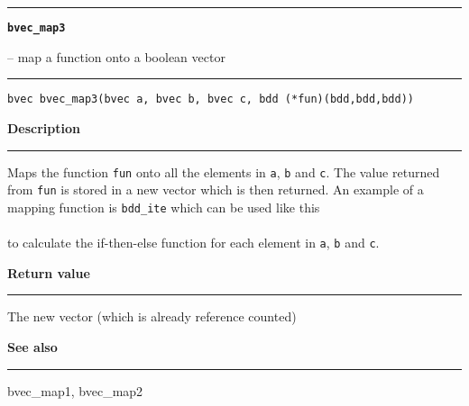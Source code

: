 \begin{minipage}{\textwidth}

\noindent\begin{minipage}{\textwidth}
\rule{\textwidth}{0.5mm}
{\tt\bf bvec\_map3 }
\--- map a function onto a boolean vector  \hspace{\fill}
\\\rule[1.5ex]{\textwidth}{0.5mm}
\end{minipage}

\noindent\begin{verbatim}
bvec bvec_map3(bvec a, bvec b, bvec c, bdd (*fun)(bdd,bdd,bdd)) 
\end{verbatim}

\vspace{\parsep}\noindent
{\bf Description}\\\rule[1.5ex]{\textwidth}{0.2mm}\vspace{-1.5ex}\setlength{\parindent}{1em}
Maps the function {\tt fun} onto all the elements in {\tt a},
           {\tt b} and {\tt c}. The value returned from {\tt fun} is stored
	   in a new vector which is then returned. An example of a mapping
	   function is {\tt bdd\_ite} which can be used like this\\

	   \\

	   \noindent to calculate the if-then-else function for each element
	   in {\tt a}, {\tt b} and {\tt c}. 

\setlength{\parindent}{0em}\vspace{\parsep}\vspace{\baselineskip}\noindent
{\bf Return value}\\\rule[1.5ex]{\textwidth}{0.2mm}\vspace{-1.5ex}
The new vector (which is already reference counted) 

\vspace{\parsep}\vspace{\baselineskip}\noindent
{\bf See also}\\\rule[1.5ex]{\textwidth}{0.2mm}\vspace{-1.5ex}
bvec\_map1, bvec\_map2 
\end{minipage}
\vspace{8ex}
